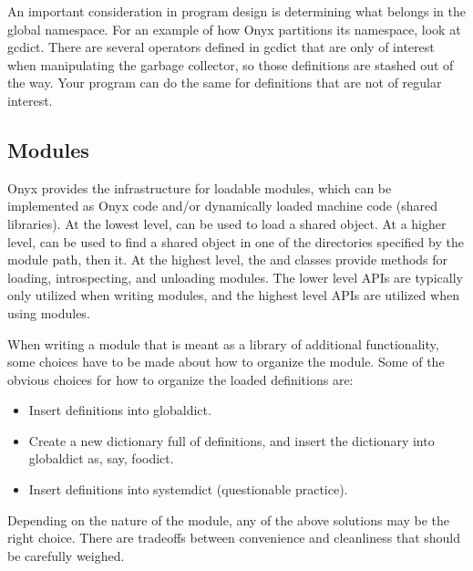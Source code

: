 An important consideration in program design is determining what belongs in the
global namespace.  For an example of how Onyx partitions its namespace, look at
gcdict.  There are several operators defined in gcdict that are only of interest
when manipulating the garbage collector, so those definitions are stashed out of
the way.  Your program can do the same for definitions that are not of regular
interest.


\subsection{Modules}
Onyx provides the infrastructure for loadable modules, which can be implemented
as Onyx code and/or dynamically loaded machine code (shared libraries).  At the
lowest level,  can be used to
load a shared object.  At a higher level,
 can be used to find a
shared object in one of the directories specified by the module path, then
 it.  At the highest level, the  and
 classes provide methods for loading, introspecting, and
unloading modules.  The lower level APIs are typically only utilized when
writing modules, and the highest level APIs are utilized when using modules.

When writing a module that is meant as a library of additional functionality,
some choices have to be made about how to organize the module.  Some of the
obvious choices for how to organize the loaded definitions are:

\begin{itemize}
\item{Insert definitions into globaldict.}
\item{Create a new dictionary full of definitions, and insert the dictionary
  into globaldict as, say, foodict.}
\item{Insert definitions into systemdict (questionable practice).}
\end{itemize}

Depending on the nature of the module, any of the above solutions may be the
right choice.  There are tradeoffs between convenience and cleanliness that
should be carefully weighed.

